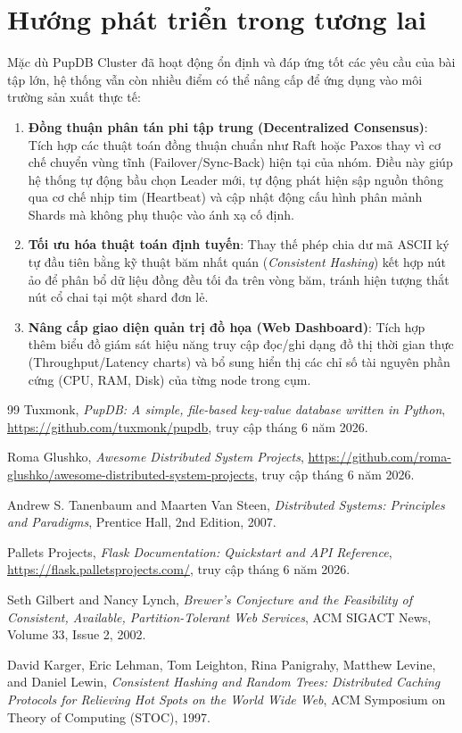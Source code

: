 \documentclass[12pt,a4paper]{report}
\begin{document}
\section{Hướng phát triển trong tương lai}
Mặc dù PupDB Cluster đã hoạt động ổn định và đáp ứng tốt các yêu cầu của bài tập lớn, hệ thống vẫn còn nhiều điểm có thể nâng cấp để ứng dụng vào môi trường sản xuất thực tế:
\begin{enumerate}
    \item \textbf{Đồng thuận phân tán phi tập trung (Decentralized Consensus)}: Tích hợp các thuật toán đồng thuận chuẩn như Raft hoặc Paxos thay vì cơ chế chuyển vùng tĩnh (Failover/Sync-Back) hiện tại của nhóm. Điều này giúp hệ thống tự động bầu chọn Leader mới, tự động phát hiện sập nguồn thông qua cơ chế nhịp tim (Heartbeat) và cập nhật động cấu hình phân mảnh Shards mà không phụ thuộc vào ánh xạ cố định.
    \item \textbf{Tối ưu hóa thuật toán định tuyến}: Thay thế phép chia dư mã ASCII ký tự đầu tiên bằng kỹ thuật băm nhất quán (\textit{Consistent Hashing}) kết hợp nút ảo để phân bổ dữ liệu đồng đều tối đa trên vòng băm, tránh hiện tượng thắt nút cổ chai tại một shard đơn lẻ.
    \item \textbf{Nâng cấp giao diện quản trị đồ họa (Web Dashboard)}: Tích hợp thêm biểu đồ giám sát hiệu năng truy cập đọc/ghi dạng đồ thị thời gian thực (Throughput/Latency charts) và bổ sung hiển thị các chỉ số tài nguyên phần cứng (CPU, RAM, Disk) của từng node trong cụm.
\end{enumerate}

\newpage

\begin{thebibliography}{99}
    Tuxmonk,
    \emph{PupDB: A simple, file-based key-value database written in Python},
    \url{https://github.com/tuxmonk/pupdb},
    truy cập tháng 6 năm 2026.
    
    Roma Glushko,
    \emph{Awesome Distributed System Projects},
    \url{https://github.com/roma-glushko/awesome-distributed-system-projects},
    truy cập tháng 6 năm 2026.
    
    Andrew S. Tanenbaum and Maarten Van Steen,
    \emph{Distributed Systems: Principles and Paradigms},
    Prentice Hall, 2nd Edition, 2007.
    
    Pallets Projects,
    \emph{Flask Documentation: Quickstart and API Reference},
    \url{https://flask.palletsprojects.com/},
    truy cập tháng 6 năm 2026.
    
    Seth Gilbert and Nancy Lynch,
    \emph{Brewer's Conjecture and the Feasibility of Consistent, Available, Partition-Tolerant Web Services},
    ACM SIGACT News, Volume 33, Issue 2, 2002.
    
    David Karger, Eric Lehman, Tom Leighton, Rina Panigrahy, Matthew Levine, and Daniel Lewin,
    \emph{Consistent Hashing and Random Trees: Distributed Caching Protocols for Relieving Hot Spots on the World Wide Web},
    ACM Symposium on Theory of Computing (STOC), 1997.
\end{thebibliography}
\end{document}

